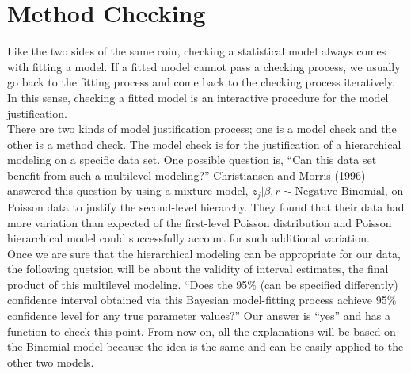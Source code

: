 \documentclass[article]{jss}
\begin{document}
\section[Method Checking]{Method Checking}
Like the two sides of the same coin, checking a statistical model always comes with fitting a model. If a fitted model cannot pass a checking process, we usually go back to the fitting process and come back to the checking process iteratively. In this sense, checking a fitted model is an interactive procedure for the model justification.
\\

There are two kinds of model justification process; one is a model check and the other is a method check. The model check is for the justification of a hierarchical modeling on a specific data set. One possible question is, ``Can this data set benefit from such a multilevel modeling?'' Christiansen and Morris (1996) answered this question by using a mixture model, $z_{j}\vert \beta, r\sim\textrm{Negative-Binomial}$, on Poisson data to justify the second-level hierarchy. They found that their data had more variation than expected of the first-level Poisson distribution and Poisson hierarchical model could successfully account for such additional variation.
\\

Once we are sure that the hierarchical modeling can be appropriate for our data, the following quetsion will be about the validity of interval estimates, the final product of this multilevel modeling. ``Does the 95\% (can be specified differently) confidence interval obtained via this Bayesian model-fitting process achieve 95\% confidence level  for any true parameter values?'' Our answer is ``yes'' and  has a function to check this point. From now on, all the explanations will be based on the Binomial model because the idea is the same and can be easily applied to the other two models.
\end{document}
